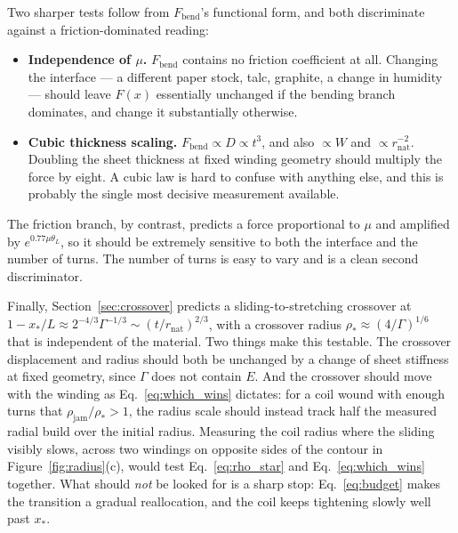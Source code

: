 \documentclass[11pt]{article}
\begin{document}
Two sharper tests follow from $F_{\mathrm{bend}}$'s functional form, and both
discriminate against a friction-dominated reading:
\begin{itemize}
\item \textbf{Independence of $\mu$.} $F_{\mathrm{bend}}$ contains no friction
  coefficient at all. Changing the interface --- a different paper stock, talc,
  graphite, a change in humidity --- should leave $F(x)$ essentially unchanged if
  the bending branch dominates, and change it substantially otherwise.
\item \textbf{Cubic thickness scaling.} $F_{\mathrm{bend}} \propto D \propto t^{3}$,
  and also $\propto W$ and $\propto r_{\mathrm{nat}}^{-2}$. Doubling the sheet
  thickness at fixed winding geometry should multiply the force by eight. A cubic
  law is hard to confuse with anything else, and this is probably the single most
  decisive measurement available.
\end{itemize}
The friction branch, by contrast, predicts a force proportional to $\mu$ and
amplified by $e^{0.77\mu\theta_L}$, so it should be extremely sensitive to both
the interface and the number of turns. The number of turns is easy to vary and is
a clean second discriminator.

Finally, Section~\ref{sec:crossover} predicts a sliding-to-stretching crossover
at $1 - x_*/L \approx 2^{-4/3}\Gamma^{-1/3}
\sim \left(t/r_{\mathrm{nat}}\right)^{2/3}$, with a crossover radius
$\rho_* \approx \left(4/\Gamma\right)^{1/6}$ that is independent of the
material. Two things make this testable. The crossover displacement and radius
should both be unchanged by a change of sheet stiffness at fixed geometry, since
$\Gamma$ does not contain $E$. And the crossover should move with the winding as
Eq.~\eqref{eq:which_wins} dictates: for a coil wound with enough turns that
$\rho_{\mathrm{jam}}/\rho_* > 1$, the radius scale should instead track half the
measured radial build over the initial radius. Measuring the coil radius where
the sliding visibly slows, across two windings on opposite sides of the contour
in Figure~\ref{fig:radius}(c), would test Eq.~\eqref{eq:rho_star} and
Eq.~\eqref{eq:which_wins} together. What should \emph{not} be looked for is a
sharp stop: Eq.~\eqref{eq:budget} makes the transition a gradual reallocation,
and the coil keeps tightening slowly well past $x_*$.


\printbibliography
\end{document}
